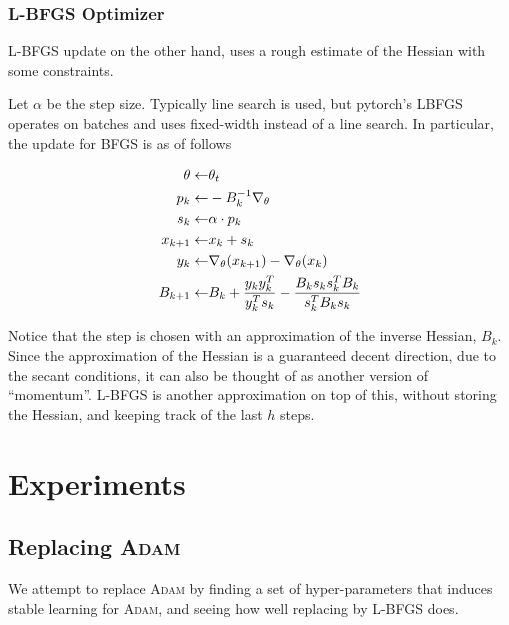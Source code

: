 \documentclass[11pt]{article}
\begin{document}
\subsubsection{\textsc{L-BFGS} Optimizer}
\textsc{L-BFGS} update on the other hand, uses a rough estimate of the Hessian with some constraints.

Let $\alpha$ be the step size. Typically line search is used, but pytorch's LBFGS operates on batches and uses fixed-width instead of a line search.
In particular, the update for \textsc{BFGS} is as of follows

\begin{align*}
  \theta \leftarrow & \theta_{t} \\
  p_k \leftarrow & -B_k^{-1}\nabla_\theta \\
  s_k \leftarrow & \alpha \cdot p_k \\
  x_{k+1} \leftarrow & x_k + s_k \\
  y_k \leftarrow & \nabla_\theta(x_{k+1}) - \nabla_\theta(x_{k}) \\
  B_{k+1} \leftarrow & B_k + \frac{y_{k}y_k^T}{y_k^{T}s_k} - \frac{B_{k}s_{k}s_{k}^{T}B_k}{s_{k}^{T}B_{k}s_k} \\ 
\end{align*}

Notice that the step is chosen with an approximation of the inverse Hessian, $B_k$.
Since the approximation of the Hessian is a guaranteed decent direction, due to the secant conditions, it can also be thought of as another version of ``momentum''.
\textsc{L-BFGS} is another approximation on top of this, without storing the Hessian, and keeping track of the last $h$ steps.

\section{Experiments}
\subsection{Replacing \textsc{Adam}}
We attempt to replace \textsc{Adam} by finding a set of hyper-parameters that induces stable learning for \textsc{Adam}, and seeing how well replacing by \textsc{L-BFGS} does.
\end{document}
